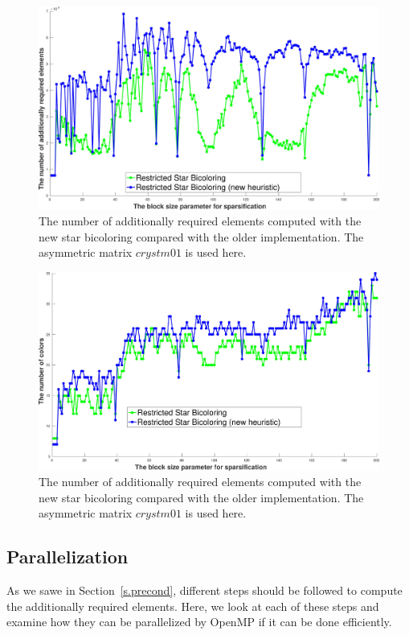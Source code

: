 \documentclass[12pt, oneside]{book}
\newcommand{\secref}[1]{Section~\protect\ref{#1}}
\begin{document}
\begin{figure}
\includegraphics[width=\linewidth]{bls_adds_crystm01_old_star_vs_new}
\caption{The number of additionally required elements computed with
the new star bicoloring compared with the older implementation. 
The asymmetric matrix \textit{$crystm01$} is used here.}
\label{bls_adds_crystm01_old_star_vs_new}
\end{figure}

\begin{figure}
\includegraphics[width=\linewidth]{bls_cols_crystm01_old_star_vs_new}
\caption{The number of additionally required elements computed with
the new star bicoloring compared with the older implementation. 
The asymmetric matrix \textit{$crystm01$} is used here.}
\label{bls_cols_crystm01_old_star_vs_new}
\end{figure}


\subsection{Parallelization}
\label{s.parallel}
As we sawe in \secref{s.precond}, different steps should be followed
to compute the additionally required elements. Here, we look at each of 
these steps and examine how they can be parallelized by OpenMP 
if it can be done efficiently.
\end{document}
